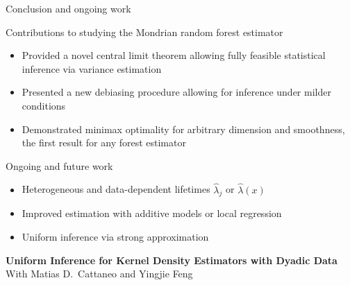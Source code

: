 \documentclass{beamer}
\begin{document}
\begin{frame}{Conclusion and ongoing work}

  \vspace*{3mm}
  Contributions to studying the Mondrian random forest estimator

  \begin{itemize}
    \item Provided a novel \alert{central limit theorem} allowing
      fully feasible \alert{statistical inference}
      via variance estimation
    \item Presented a new \alert{debiasing procedure} allowing
      for inference under milder conditions
    \item Demonstrated \alert{minimax optimality}
      for arbitrary dimension and smoothness,
      the first result for any forest estimator
  \end{itemize}

  Ongoing and future work

  \begin{itemize}
    \item Heterogeneous and data-dependent lifetimes
      $\hat \lambda_j$ or $\hat \lambda(x)$
    \item Improved estimation with additive models or local regression
    \item Uniform inference via strong approximation
  \end{itemize}

\end{frame}

\begin{frame}
  \sectionpage
  \begin{center}
    \vspace*{8mm}
    \Large{\textbf{Uniform Inference for Kernel Density Estimators
    with Dyadic Data}} \\
    \vspace*{15mm}
    \normalsize{With Matias D.\ Cattaneo and Yingjie Feng}
  \end{center}
\end{frame}
\end{document}
